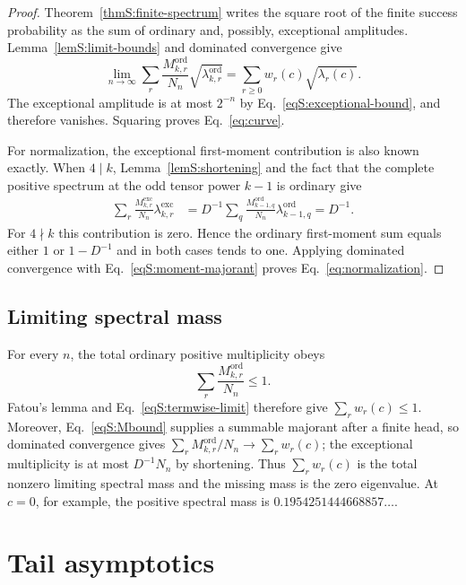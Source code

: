\documentclass[journal,twocolumn]{IEEEtran}
\theoremstyle{definition}
\theoremstyle{plain}
\newcommand{\Ord}{\mathrm{ord}}
\newcommand{\Exc}{\mathrm{exc}}
\begin{document}
\begin{proof}
Theorem~\ref{thmS:finite-spectrum} writes the square root of the finite
success probability as the sum of ordinary and, possibly, exceptional
amplitudes.  Lemma~\ref{lemS:limit-bounds} and dominated convergence give
\begin{equation}
 \lim_{n\to\infty}
 \sum_r\frac{M^{\Ord}_{k,r}}{N_n}
 \sqrt{\lambda^{\Ord}_{k,r}}
 =\sum_{r\geq0}w_r(c)\sqrt{\lambda_r(c)}.
\end{equation}
The exceptional amplitude is at most $2^{-n}$ by
Eq.~\eqref{eqS:exceptional-bound}, and therefore vanishes.  Squaring proves
Eq.~\eqref{eq:curve}.

For normalization, the exceptional first-moment contribution is also known
exactly.  When $4\mid k$, Lemma~\ref{lemS:shortening} and the fact that the
complete positive spectrum at the odd tensor power $k-1$ is ordinary give
\begin{align}
 \sum_r\frac{M^{\Exc}_{k,r}}{N_n}\lambda^{\Exc}_{k,r}
 &=D^{-1}\sum_q\frac{M^{\Ord}_{k-1,q}}{N_n}
                 \lambda^{\Ord}_{k-1,q}
 =D^{-1}.
 \label{eqS:exceptional-first-moment}
\end{align}
For $4\nmid k$ this contribution is zero.  Hence the ordinary first-moment
sum equals either $1$ or $1-D^{-1}$ and in both cases tends to one.  Applying
dominated convergence with Eq.~\eqref{eqS:moment-majorant} proves
Eq.~\eqref{eq:normalization}.
\end{proof}

\subsection{Limiting spectral mass}
\label{app:spectral-mass}

For every $n$, the total ordinary positive multiplicity obeys
\begin{equation}
 \sum_r\frac{M^{\Ord}_{k,r}}{N_n}\leq1.
\end{equation}
Fatou's lemma and Eq.~\eqref{eqS:termwise-limit} therefore give
$\sum_rw_r(c)\leq1$.  Moreover, Eq.~\eqref{eqS:Mbound} supplies a
summable majorant after a finite head, so dominated convergence gives
$\sum_rM^{\Ord}_{k,r}/N_n\to\sum_rw_r(c)$; the exceptional multiplicity
is at most $D^{-1}N_n$ by shortening.  Thus $\sum_rw_r(c)$ is the total
nonzero limiting spectral mass and the missing mass is the zero
eigenvalue.  At $c=0$, for example, the positive spectral mass is
$0.1954251444668857\ldots$.

\section{Tail asymptotics}
\label{app:tails}
\end{document}
